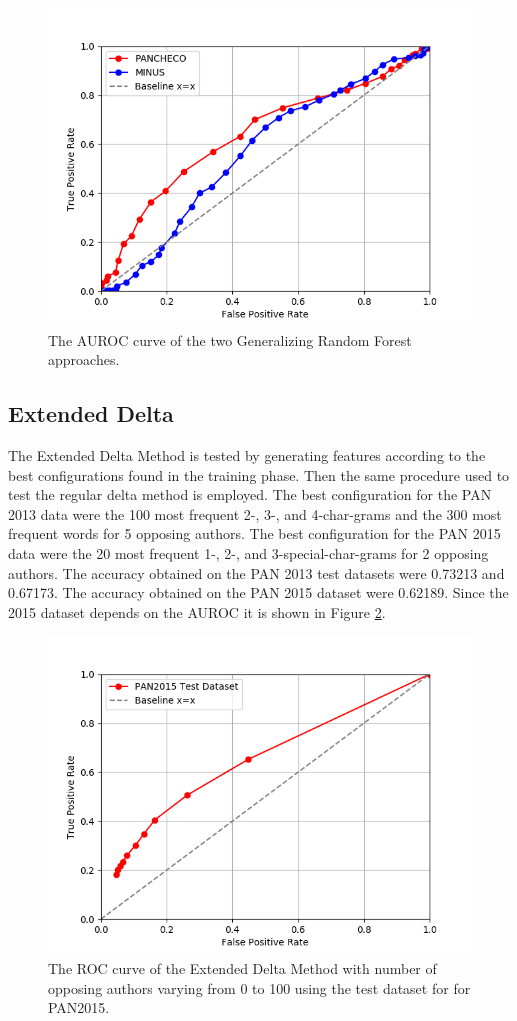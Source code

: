 \begin{figure}
    \centering
    \includegraphics[width=.7\textwidth]{./pictures/forest_roc.png}
    \caption{The \gls{AUROC} curve of the two Generalizing Random Forest
    approaches.}
    \label{fig:forest_roc}
\end{figure}

\subsection{Extended Delta}
The Extended Delta Method is tested by generating features according to the best
configurations found in the training phase. Then the same procedure used to test
the regular delta method is employed. The best configuration for the PAN 2013
data were the 100 most frequent 2-, 3-, and 4-char-grams and the 300 most
frequent words for 5 opposing authors. The best configuration for the PAN 2015
data were the 20 most frequent 1-, 2-, and 3-special-char-grams for 2 opposing
authors. The accuracy obtained on the PAN 2013 test datasets were 0.73213 and
0.67173. The accuracy obtained on the PAN 2015 dataset were 0.62189. Since the
2015 dataset depends on the \gls{AUROC} it is shown in Figure
\ref{fig:extended_delta_method_roc}.

\begin{figure}
    \centering
    \includegraphics[width=.7\textwidth]{./pictures/extended_delta_method_roc.png}
    \caption{The ROC curve of the Extended Delta Method with number of opposing
    authors varying from 0 to 100 using the test dataset for for PAN2015.}
    \label{fig:extended_delta_method_roc}
\end{figure}

